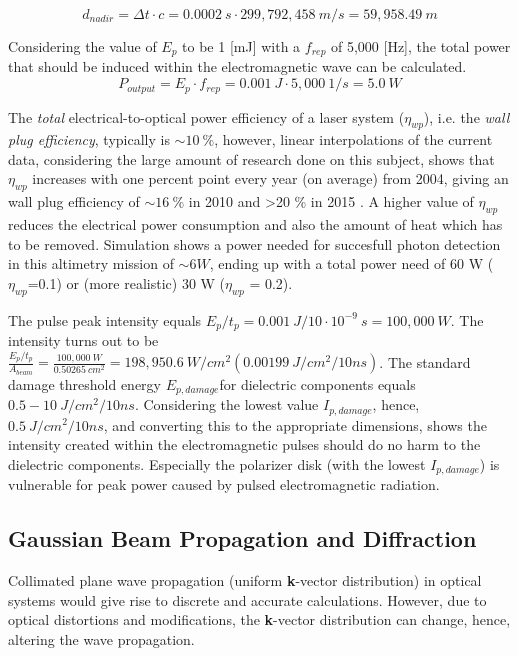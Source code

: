 \begin{equation}
\label{alongtracknadir}
d_{nadir} = \Delta t \cdot c = 0.0002\ s \cdot 299,792,458\ m/s = 59,958.49\ m
\end{equation}

Considering the value of $E_{p}$ to be 1 [mJ] with a $f_{rep}$ of 5,000 [Hz], the total power that should be induced within the electromagnetic wave can be calculated.
\begin{equation}
\label{outputpower}
P_{output} = E_{p} \cdot f_{rep} = 0.001\ J \cdot 5,000\ 1/s = 5.0\ W
\end{equation}

The \textit{total} electrical-to-optical power efficiency of a laser system ($\eta_{wp}$), i.e. the \textit{wall plug efficiency}, typically is $\sim 10\ \%$, however, linear interpolations of the current data, considering the large amount of research done on this subject, shows that $\eta_{wp}$ increases with one percent point every year (on average) from 2004, giving an wall plug efficiency of $\sim16\ \%$ in 2010 and \textgreater20 \% in 2015 \cite{nd_yag_life}. A higher value of $\eta_{wp}$ reduces the electrical power consumption and also the amount of heat which has to be removed. Simulation shows a power needed for succesfull photon detection in this altimetry mission of $\sim6 W$, ending up with a total power need of 60 W ($\eta_{wp}$=0.1) or (more realistic) 30 W ($\eta_{wp}$ = 0.2). 
  
The pulse peak intensity equals $E_{p}/t_{p} = 0.001\ J / 10\cdot10^{-9}\ s = 100,000\ W$. The intensity turns out to be $\frac{E_{p}/t_{p}}{A_{beam}} = \frac{100,000\ W}{0.50265\ cm^{2}} = 198,950.6\ W/cm^{2} (0.00199\ J/cm^{2}/10ns)$. The standard damage threshold energy $E_{p,damage}$for dielectric components equals $0.5 - 10\ J/cm^{2}/10ns$. Considering the lowest value $I_{p,damage}$, hence, $0.5\ J/cm^{2}/10ns$, and converting this to the appropriate dimensions, shows the intensity created within the electromagnetic pulses should do no harm to the dielectric components. Especially the polarizer disk (with the lowest $I_{p,damage}$) is vulnerable for peak power caused by pulsed electromagnetic radiation. 

\subsection{Gaussian Beam Propagation and Diffraction}
	\label{diffraction}

Collimated plane wave propagation (uniform \textbf{k}-vector distribution) in optical systems would give rise to discrete and accurate calculations. However, due to optical distortions and modifications, the \textbf{k}-vector distribution can change, hence, altering the wave propagation. 

